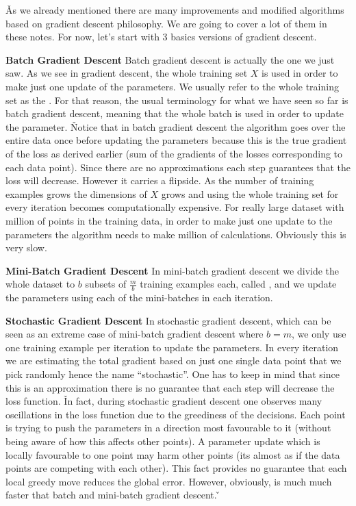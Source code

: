\v

As we already mentioned there are many improvements and modified algorithms based on gradient descent philosophy. We
are going to cover a lot of them in these notes. For now, let's start with 3 basics versions of gradient descent.
\bit
\item \textbf{Batch Gradient Descent} Batch gradient descent is actually the one we just saw. As we see in gradient
descent, the whole training set $X$ is used in order to make just one update of the parameters. We usually refer to
the whole training set as the . For that reason, the usual terminology for what we have seen so far is
batch gradient descent, meaning that the whole batch is used in order to update the parameter. \v

Notice that in batch gradient descent the algorithm goes over the entire data once before updating the parameters
because this is the true gradient of the loss as derived earlier (sum of the gradients of the losses corresponding to
each data point). Since there are no approximations each step guarantees that the loss will decrease. However it
carries a flipside. As the number of training examples grows the dimensions of $X$ grows and using the whole training
set for every iteration becomes computationally expensive. For really large dataset with million of points in the
training data, in order to make just one update to the parameters the algorithm needs to make million of calculations. 
Obviously this is very slow.
\item \textbf{Mini-Batch Gradient Descent} In mini-batch gradient descent we divide the whole dataset to $b$ subsets
of $\frac{m}{b}$ training examples each, called , and we update the parameters using each of the
mini-batches in each iteration.

\item \textbf{Stochastic Gradient Descent} In stochastic gradient descent, which can be seen as an extreme case of
mini-batch gradient descent where $b=m$, we only use one training example per iteration to update the parameters. In
every iteration we are estimating the total gradient based on just one single data point that we pick randomly hence
the name ``stochastic''. One has to keep in mind that since this is an approximation there is no guarantee that each
step will decrease the loss function. \v

In fact, during stochastic gradient descent one observes many oscillations in the loss function due to the greediness
of the decisions. Each point is trying to push the parameters in a direction most favourable to it (without being
aware of how this affects other points). A parameter update which is locally favourable to one point may harm other
points (its almost as if the data points are competing with each other). This fact provides no guarantee that each
local greedy move reduces the global error. However, obviously, is much much faster that batch and mini-batch
gradient descent. \v

